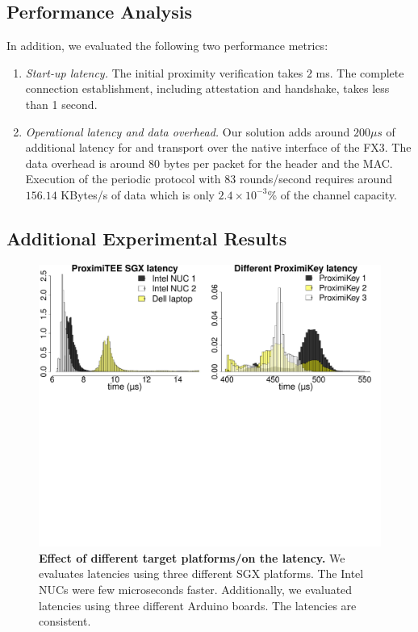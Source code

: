 \subsection{Performance Analysis}

In addition, we evaluated the following two performance metrics:

\begin{enumerate}
  \item \emph{Start-up latency.} The initial proximity verification takes $2$ ms. The complete connection establishment, including attestation and \tls handshake, takes less than 1 second.  
  


  \item \emph{Operational latency and data overhead.} Our solution adds around $200 \mu s$ of additional latency for \tls and transport over the native \usb interface of the FX3. The data overhead is around 80 bytes per packet for the header and the MAC. Execution of the periodic \name protocol with $83$ rounds/second requires around $156.14$ KBytes/s of data which is only $2.4 \times 10^{-3}$\% of the  channel capacity. 


\end{enumerate}


\subsection{Additional Experimental Results}


\begin{figure}[t]
  \centering
    \includegraphics[trim={0 18cm 0 0}, clip, width=\linewidth]{chapters/ProximiTEE/data/graph/PlatformDevice_1.pdf}
    \caption[Effect of different target platforms/\device on the latency.]{\textbf{Effect of different target platforms/\device on the latency.} We evaluates latencies using three different SGX platforms. The Intel NUCs were few microseconds faster. Additionally, we evaluated latencies using three different Arduino boards. The latencies are consistent.}
    \label{graph:sgxLatency}
\end{figure}

